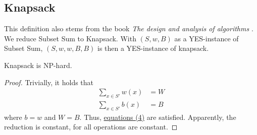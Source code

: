 \subsection{Knapsack}
This definition also stems from the book \textit{The design and analysis of algorithms} \cite{kozen1992design}. 
We reduce Subset Sum to Knapsack. With $(S, w, B)$ as a YES-instance of Subset Sum, $(S, w, w, B, B)$
is then a YES-instance of knapsack.
\begin{theorem}
    Knapsack is NP-hard.
\end{theorem}
\begin{proof}
    Trivially, it holds that 
    \begin{align*}
        \sum_{x \in S'} w(x) &= W \\ 
        \sum_{x \in S'} b(x) &= B
    \end{align*}
    where $b = w$ and $W = B$. Thus, \hyperref[eq:4]{equations (4)} are satisfied.
    Apparently, the reduction is constant, for all operations are constant. 
\end{proof}

